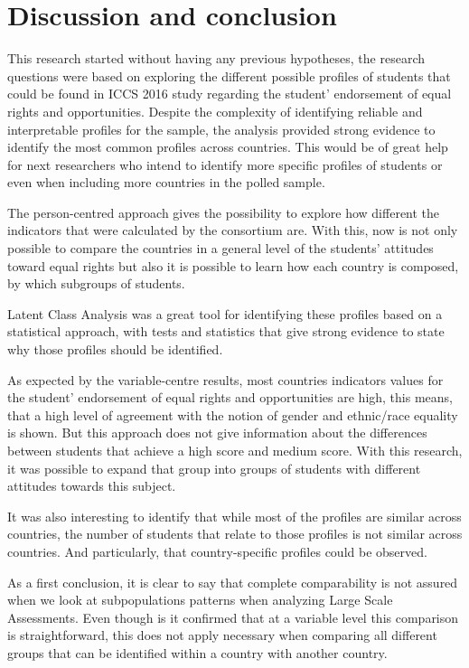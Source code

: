 \documentclass[12pt,a4paper,oneside]{reedthesis}
\begin{document}
\clearpage

\hypertarget{discussion-and-conclusion}{%
\chapter{Discussion and conclusion}\label{discussion-and-conclusion}}

This research started without having any previous hypotheses, the research questions were based on exploring the different possible profiles of students that could be found in ICCS 2016 study regarding the student' endorsement of equal rights and opportunities. Despite the complexity of identifying reliable and interpretable profiles for the sample, the analysis provided strong evidence to identify the most common profiles across countries. This would be of great help for next researchers who intend to identify more specific profiles of students or even when including more countries in the polled sample.

The person-centred approach gives the possibility to explore how different the indicators that were calculated by the consortium are. With this, now is not only possible to compare the countries in a general level of the students' attitudes toward equal rights but also it is possible to learn how each country is composed, by which subgroups of students.

Latent Class Analysis was a great tool for identifying these profiles based on a statistical approach, with tests and statistics that give strong evidence to state why those profiles should be identified.

As expected by the variable-centre results, most countries indicators values for the student' endorsement of equal rights and opportunities are high, this means, that a high level of agreement with the notion of gender and ethnic/race equality is shown. But this approach does not give information about the differences between students that achieve a high score and medium score. With this research, it was possible to expand that group into groups of students with different attitudes towards this subject.

It was also interesting to identify that while most of the profiles are similar across countries, the number of students that relate to those profiles is not similar across countries. And particularly, that country-specific profiles could be observed.

As a first conclusion, it is clear to say that complete comparability is not assured when we look at subpopulations patterns when analyzing Large Scale Assessments. Even though is it confirmed that at a variable level this comparison is straightforward, this does not apply necessary when comparing all different groups that can be identified within a country with another country.
\end{document}
